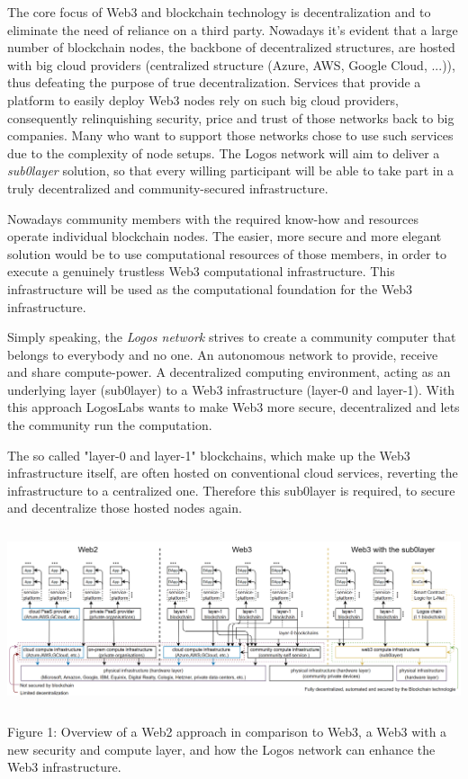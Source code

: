 \documentclass[]{article}
\begin{document}
The core focus of Web3 and blockchain technology is decentralization and to eliminate the need of reliance on a third party.
Nowadays it's evident that a large number of blockchain nodes, the backbone of decentralized structures, are hosted with big cloud providers (centralized structure (Azure, AWS, Google Cloud, ...)), thus defeating the purpose of true decentralization.
Services that provide a platform to easily deploy Web3 nodes rely on such big cloud providers, consequently relinquishing security, price and trust of those networks back to big companies.
Many who want to support those networks chose to use such services due to the complexity of node setups. 
The Logos network will aim to deliver a \textit{sub0layer} solution, so that every willing participant will be able to take part in a truly decentralized and community-secured infrastructure.

Nowadays community members with the required know-how and resources operate individual blockchain nodes. 
The easier, more secure and more elegant solution would be to use computational resources of those members, in order to execute a genuinely trustless Web3 computational infrastructure. 
This infrastructure will be used as the computational foundation for the Web3 infrastructure.

Simply speaking, the \textit{Logos network} strives to create a community computer that belongs to everybody and no one.
An autonomous network to provide, receive and share compute-power.
A decentralized computing environment, acting as an underlying layer (sub0layer) to a Web3 infrastructure (layer-0 and layer-1).
With this approach LogosLabs wants to make Web3 more secure, decentralized and lets the community run the computation.

The so called "layer-0 and layer-1" blockchains, which make up the Web3 infrastructure itself, are often hosted on conventional cloud services, reverting the infrastructure to a centralized one. 
Therefore this sub0layer is required, to secure and decentralize those hosted nodes again.

\begin{center}
	\includegraphics[height=5.2cm]{network-requirement}
\end{center}
\begin{center}
	Figure 1: Overview of a Web2 approach in comparison to Web3, a Web3 with a new security and compute layer, and how the Logos network can enhance the Web3 infrastructure.
\end{center}
\end{document}
